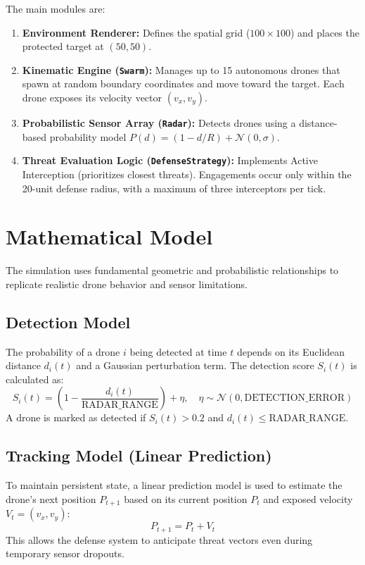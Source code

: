 \documentclass[11pt,a4paper]{article}
\begin{document}
The main modules are:
\begin{enumerate}
    \item \textbf{Environment Renderer:} Defines the spatial grid ($100 \times 100$) and places the protected target at $(50,50)$.
    \item \textbf{Kinematic Engine (\texttt{Swarm}):} Manages up to 15 autonomous drones that spawn at random boundary coordinates and move toward the target. Each drone exposes its velocity vector $(v_x, v_y)$.
    \item \textbf{Probabilistic Sensor Array (\texttt{Radar}):} Detects drones using a distance-based probability model $P(d) = (1 - d/R) + \mathcal{N}(0, \sigma)$.
    \item \textbf{Threat Evaluation Logic (\texttt{DefenseStrategy}):} Implements Active Interception (prioritizes closest threats). Engagements occur only within the 20-unit defense radius, with a maximum of three interceptors per tick.
\end{enumerate}

\section{Mathematical Model}
The simulation uses fundamental geometric and probabilistic relationships to replicate realistic drone behavior and sensor limitations.

\subsection{Detection Model}
The probability of a drone $i$ being detected at time $t$ depends on its Euclidean distance $d_i(t)$ and a Gaussian perturbation term. The detection score $S_i(t)$ is calculated as:
\begin{equation}
    S_i(t) = \left( 1 - \frac{d_i(t)}{\text{RADAR\_RANGE}} \right) + \eta, \quad \eta \sim \mathcal{N}(0, \text{DETECTION\_ERROR})
\end{equation}
A drone is marked as detected if $S_i(t) > 0.2$ and $d_i(t) \le \text{RADAR\_RANGE}$.

\subsection{Tracking Model (Linear Prediction)}
To maintain persistent state, a linear prediction model is used to estimate the drone's next position $P_{t+1}$ based on its current position $P_t$ and exposed velocity $V_t = (v_x, v_y)$:
\begin{equation}
    P_{t+1} = P_t + V_t
\end{equation}
This allows the defense system to anticipate threat vectors even during temporary sensor dropouts.
\end{document}
